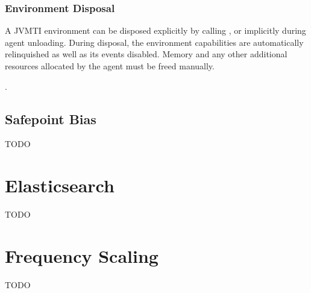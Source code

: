 \subsubsection*{Environment Disposal}

A JVMTI environment can be disposed explicitly by calling , or implicitly during agent unloading. During disposal, the environment capabilities are automatically relinquished as well as its events disabled. Memory and any other additional resources allocated by the agent must be freed manually.

.

\subsection{Safepoint Bias}







TODO

\section{Elasticsearch}

TODO

\section{Frequency Scaling}

TODO








